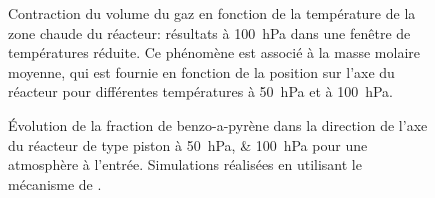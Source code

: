 \begin{figure}[!h]
  \caption{Contraction du volume du gaz en fonction de la température de la zone chaude du réacteur:   \protect{} résultats à \SI{100}{\hecto\pascal} dans une fenêtre de températures réduite. Ce phénomène est associé à la masse molaire moyenne, qui est fournie en fonction de la position sur l'axe du réacteur pour différentes températures à \protect{} \SI{50}{\hecto\pascal} et à \protect{} \SI{100}{\hecto\pascal}.}
\end{figure}

\begin{figure}[!h]
  \centering
  \hfill
  
  \caption{\label{fig:species-BAPYR}Évolution de la fraction de benzo-a-pyrène dans la direction de l'axe du réacteur de type piston à \SIlist{50;100}{\hecto\pascal} pour une atmosphère  à l'entrée. Simulations réalisées en utilisant le mécanisme de \citet{Norinaga2009}.}
\end{figure}

